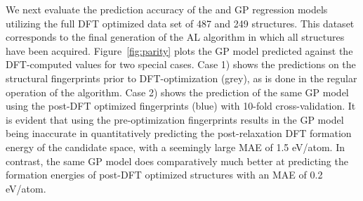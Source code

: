 We next evaluate the prediction accuracy of the \IrOtwo and \IrOthree GP regression models utilizing the full DFT optimized data set of 487 \IrOtwo and 249 \IrOthree structures.
%
This dataset corresponds to the final generation of the AL algorithm in which all structures have been acquired.
%
Figure~\ref{fig:parity} plots the GP model predicted \DHf against the DFT-computed values for two special cases.
%
Case 1) shows the predictions on the structural fingerprints prior to DFT-optimization (grey), as is done in the regular operation of the algorithm.
%
Case 2) shows the prediction of the same GP model using the post-DFT optimized fingerprints (blue) with \num{10}-fold cross-validation.
%
It is evident that using the pre-optimization fingerprints results in the GP model being inaccurate in quantitatively predicting the post-relaxation DFT formation energy of the candidate space,
with a seemingly large MAE of \mytilde\num{1.5} eV/atom.
%
In contrast, the same GP model does comparatively much better at predicting the formation energies of post-DFT optimized structures with an MAE of \mytilde\num{0.2} eV/atom.


